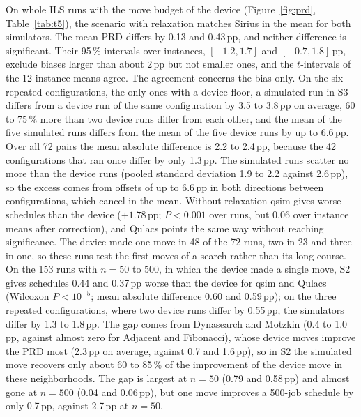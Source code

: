 \documentclass{scspaperproc}
\begin{document}
On whole ILS runs with the move budget of the device (Figure~\ref{fig:prd},
Table~\ref{tab:t5}), the scenario with relaxation matches Sirius in the mean
for both simulators. The mean PRD differs by 0.13 and 0.43\,pp, and neither
difference is significant. Their 95\,\% intervals over instances, $[-1.2, 1.7]$
and $[-0.7, 1.8]$\,pp, exclude biases larger than about 2\,pp but not smaller
ones, and the $t$-intervals of the 12 instance means agree. The
agreement concerns the bias only. On the six repeated configurations, the only
ones with a device floor, a simulated run in S3 differs from a device run of
the same configuration by 3.5 to 3.8\,pp on average, 60 to 75\,\% more than two
device runs differ from each other, and the mean of the five simulated runs
differs from the mean of the five device runs by up to 6.6\,pp. Over all 72
pairs the mean absolute difference is 2.2 to 2.4\,pp, because the 42
configurations that ran once differ by only 1.3\,pp. The simulated runs
scatter no more than the device runs (pooled standard deviation 1.9 to 2.2
against 2.6\,pp), so the excess comes from offsets of up to 6.6\,pp in both
directions between configurations, which cancel in the mean. Without relaxation qsim gives worse schedules than the device
($+1.78$\,pp; $P < 0.001$ over runs, but 0.06 over instance means after
correction), and Qulacs points the same way without reaching significance.
The device made one move in 48 of the 72 runs, two in 23 and three in one, so
these runs test the first moves of a search rather than its long course. On
the 153 runs with $n = 50$ to $500$, in which the device made a single move,
S2 gives schedules 0.44 and 0.37\,pp worse than the device for qsim and
Qulacs (Wilcoxon $P < 10^{-5}$; mean absolute difference 0.60 and 0.59\,pp);
on the three repeated configurations, where two device runs differ by
0.55\,pp, the simulators differ by 1.3 to 1.8\,pp.
The gap comes from Dynasearch and Motzkin (0.4 to 1.0\,pp, against almost zero
for Adjacent and Fibonacci), whose device moves improve the PRD most (2.3\,pp
on average, against 0.7 and 1.6\,pp), so in S2 the simulated move recovers only
about 60 to 85\,\% of the improvement of the device move in these
neighborhoods. The gap is largest at $n = 50$ (0.79 and 0.58\,pp) and almost
gone at $n = 500$ (0.04 and 0.06\,pp), but one move improves a 500-job schedule
by only 0.7\,pp, against 2.7\,pp at $n = 50$.
\end{document}
